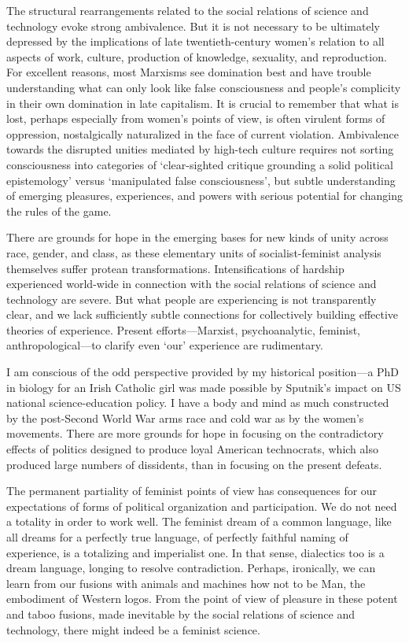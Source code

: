 \documentclass[DIV=12,%
               BCOR=10mm,%
               headinclude=false,%
               footinclude=false,open=any,%
               fontsize=11pt,%
               twoside,%
               paper=210mm:11in]%
               {scrbook}
\begin{document}
The structural rearrangements related to the social relations of science and technology evoke strong ambivalence. But it is not necessary to be ultimately depressed by the implications of late twentieth-century women’s relation to all aspects of work, culture, production of knowledge, sexuality, and reproduction. For excellent reasons, most Marxisms see domination best and have trouble understanding what can only look like false consciousness and people’s complicity in their own domination in late capitalism. It is crucial to remember that what is lost, perhaps especially from women’s points of view, is often virulent forms of oppression, nostalgically naturalized in the face of current violation. Ambivalence towards the disrupted unities mediated by high-tech culture requires not sorting consciousness into categories of ‘clear-sighted critique grounding a solid political epistemology’ versus ‘manipulated false consciousness’, but subtle understanding of emerging pleasures, experiences, and powers with serious potential for changing the rules of the game.


There are grounds for hope in the emerging bases for new kinds of unity across race, gender, and class, as these elementary units of socialist-feminist analysis themselves suffer protean transformations. Intensifications of hardship experienced world-wide in connection with the social relations of science and technology are severe. But what people are experiencing is not transparently clear, and we lack sufficiently subtle connections for collectively building effective theories of experience. Present efforts—Marxist, psychoanalytic, feminist, anthropological—to clarify even ‘our’ experience are rudimentary.


I am conscious of the odd perspective provided by my historical position—a PhD in biology for an Irish Catholic girl was made possible by Sputnik’s impact on US national science-education policy. I have a body and mind as much constructed by the post-Second World War arms race and cold war as by the women’s movements. There are more grounds for hope in focusing on the contradictory effects of politics designed to produce loyal American technocrats, which also produced large numbers of dissidents, than in focusing on the present defeats.


The permanent partiality of feminist points of view has consequences for our expectations of forms of political organization and participation. We do not need a totality in order to work well. The feminist dream of a common language, like all dreams for a perfectly true language, of perfectly faithful naming of experience, is a totalizing and imperialist one. In that sense, dialectics too is a dream language, longing to resolve contradiction. Perhaps, ironically, we can learn from our fusions with animals and machines how not to be Man, the embodiment of Western logos. From the point of view of pleasure in these potent and taboo fusions, made inevitable by the social relations of science and technology, there might indeed be a feminist science.
\end{document}
